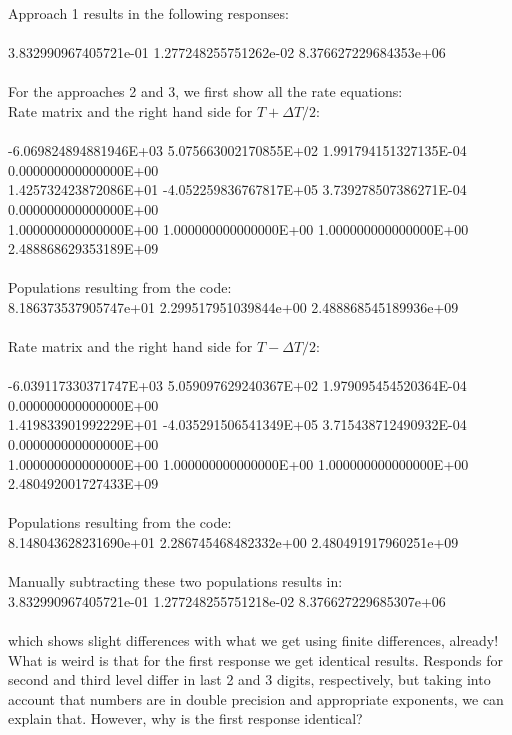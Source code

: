 \documentclass[a4paper,10pt]{article}
\begin{document}
Approach 1 results in the following responses:\\
\\
3.832990967405721e-01 1.277248255751262e-02 8.376627229684353e+06\\
\\
For the approaches 2 and 3, we first show all the rate equations:\\
Rate matrix and the right hand side for $T + \Delta T/2$:\\
\\
-6.069824894881946E+03 5.075663002170855E+02 1.991794151327135E-04 0.000000000000000E+00 \\ 
1.425732423872086E+01 -4.052259836767817E+05 3.739278507386271E-04 0.000000000000000E+00 \\
1.000000000000000E+00 1.000000000000000E+00 1.000000000000000E+00 2.488868629353189E+09 \\
\\
Populations resulting from the code:\\
8.186373537905747e+01 2.299517951039844e+00 2.488868545189936e+09\\
\\
Rate matrix and the right hand side for $T - \Delta T/2$:\\
\\
-6.039117330371747E+03 5.059097629240367E+02 1.979095454520364E-04 0.000000000000000E+00 \\ 
1.419833901992229E+01 -4.035291506541349E+05 3.715438712490932E-04 0.000000000000000E+00 \\
1.000000000000000E+00 1.000000000000000E+00 1.000000000000000E+00 2.480492001727433E+09 \\
\\
Populations resulting from the code:\\
8.148043628231690e+01 2.286745468482332e+00 2.480491917960251e+09 \\
\\
Manually subtracting these two populations results in:\\
3.832990967405721e-01 1.277248255751218e-02 8.376627229685307e+06\\
\\
which shows slight differences with what we get using finite differences, already! What is weird is that for the first response we get identical results. Responds for second and third level differ in last 2 and 3 digits, respectively, but taking into account that numbers are in double precision and appropriate exponents, we can explain that. However, why is the first response identical? \\
\end{document}
